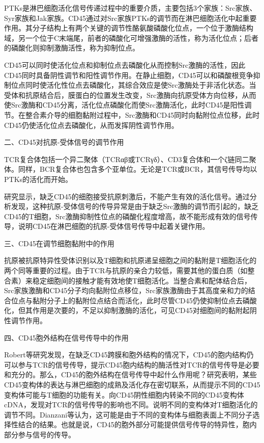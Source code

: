 PTKs是淋巴细胞活化信号传递过程中的重要介质，主要包括3个家族：Src家族、Syr家族和Jak家族。CD45通过对Src家族PTKs的调节而在淋巴细胞活化中起重要作用。其分子结构上有两个关键的调节性酪氨酸磷酸化位点，一个位于激酶结构域，另一个位于C末端尾，前者的磷酸化可增强激酶的活性，称为活化位点；后者的磷酸化则抑制激酶活性，称为抑制位点。

CD45可以同时使活化位点和抑制位点去磷酸化从而控制Src激酶的活性，因此CD45同时具备阴性调节和阳性调节作用。在静止细胞，CD45可以和磷酸根竞争抑制位点同时使活化性位点去磷酸化，其综合效应是使Src激酶处于非活化状态。当受体和抗原结合后，膜蛋白的位置发生改变，Src激酶向抗原受体方向位移，从而使Src激酶和CD45分离，活化位点磷酸化而使Src激酶活化，此时CD45是阳性调节。在整合素介导的细胞黏附过程中，Src激酶和CD45同时向黏附位点位移，此时CD45仍使活化位点去磷酸化，从而发挥阴性调节作用。

\begin{center}
 {\large 二、CD45对抗原-受体信号的调节作用}
 \end{center}

TCR复合体包括一个异二聚体（TCRαβ或TCRγδ）、CD3复合体和一个ζ链同二聚体。同样，BCR复合体也包含多个亚单位。无论是TCR或BCR，其信号传导均以PTKs的活化而开始。

研究显示，缺乏CD45的细胞接受抗原刺激后，不能产生有效的活化信号。通过分析发现，这种抗原-受体信号的传导异常是由于缺乏Src激酶的调节而引起的，缺乏CD45的T细胞，Src激酶抑制性位点的磷酸化程度增高，故不能形成有效的信号传导，说明CD45在淋巴细胞的抗原-受体信号传导中起着关键作用。

\begin{center}
 {\large 三、CD45在调节细胞黏附中的作用}
 \end{center}

抗原被抗原特异性受体识别以及T细胞和抗原递呈细胞之间的黏附是T细胞活化的两个同等重要的过程。由于TCR与抗原的亲合力较低，需要其他的蛋白质（如整合素）来稳定细胞间的接触才能有效地使T细胞活化。当整合素和配体结合后，Src家族激酶和CD45分子均向黏附位点移位，Src家族激酶由于其高度亲和力的结合位点与黏附分子上的黏附位点结合而活化，此时尽管CD45仍使抑制位点去磷酸化，但其作用是次要的，不足以抑制激酶的活化，可见CD45对细胞间的黏附起阴性调节作用。

\begin{center}
 {\large 四、CD45胞外结构在信号传导中的作用}
 \end{center}

Robert等研究发现，在缺乏CD45跨膜和胞外结构的情况下，CD45的胞内结构仍可以参与TCR的信号传导，提示CD45胞内结构的酶活性对TCR的信号传导是必要和充分的。那么，CD45的胞外结构在信号传导中起什么作用呢？研究表明，某些CD45变构体的表达与淋巴细胞的成熟及活化存在密切联系，从而提示不同的CD45变构体可能与T细胞的功能有关。向CD45阴性细胞内转染不同的CD45变构体cDNA，发现对TCR的信号传导的影响也不同。说明不同的变构体对T细胞活化的调节不同。Dianzani等认为，这可能是由于不同的变构体与细胞表面上不同分子选择性结合的结果。也就是说，CD45的胞外部分可能提供信号传导的特异性，胞内部分参与信号的传导。

